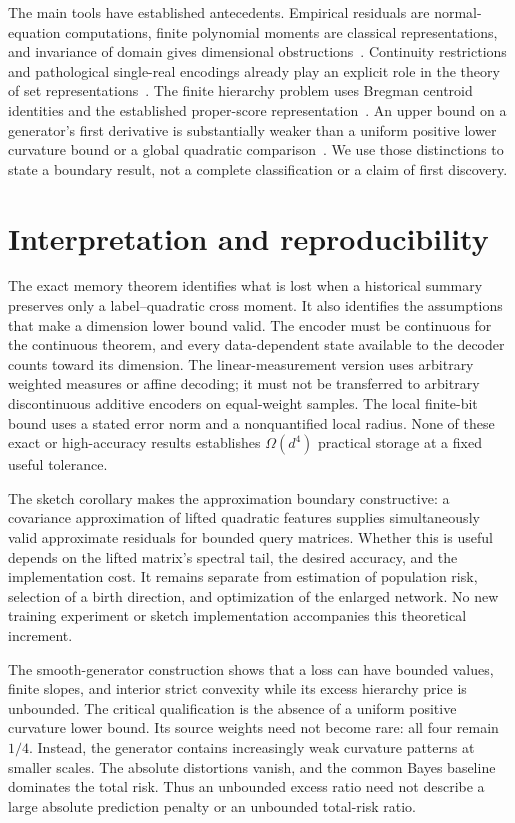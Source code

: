 \documentclass[11pt]{article}
\theoremstyle{remark}
\begin{document}
The main tools have established antecedents. Empirical residuals are
normal-equation computations, finite polynomial moments are classical
representations, and invariance of domain gives dimensional
obstructions~\cite{mit,tchakaloff,tao}. Continuity restrictions and
pathological single-real encodings already play an explicit role in
the theory of set representations~\cite{wagstaff}. The finite
hierarchy problem uses Bregman centroid identities and the established
proper-score representation~\cite{banerjee2005,telgarsky2012,p7gneiting2007}.
An upper bound on a generator's first derivative is substantially
weaker than a uniform positive lower curvature bound or a global
quadratic comparison~\cite{ackermann2009}. We use those distinctions
to state a boundary result, not a complete classification or a claim
of first discovery.





\section{Interpretation and reproducibility}
\label{sec:discussion}

The exact memory theorem identifies what is lost when a historical
summary preserves only a label--quadratic cross moment. It also
identifies the assumptions that make a dimension lower bound valid.
The encoder must be continuous for the continuous theorem, and every
data-dependent state available to the decoder counts toward its
dimension. The linear-measurement version uses arbitrary weighted
measures or affine decoding; it must not be transferred to arbitrary
discontinuous additive encoders on equal-weight samples. The local
finite-bit bound uses a stated error norm and a nonquantified local
radius. None of these exact or high-accuracy results establishes
$\Omega(d^4)$ practical storage at a fixed useful tolerance.

The sketch corollary makes the approximation boundary constructive:
a covariance approximation of lifted quadratic features supplies
simultaneously valid approximate residuals for bounded query matrices.
Whether this is useful depends on the lifted matrix's spectral tail,
the desired accuracy, and the implementation cost. It remains
separate from estimation of population risk, selection of a birth
direction, and optimization of the enlarged network. No new training
experiment or sketch implementation accompanies this theoretical
increment.

The smooth-generator construction shows that a loss can have bounded
values, finite slopes, and interior strict convexity while its excess
hierarchy price is unbounded. The critical qualification is the
absence of a uniform positive curvature lower bound. Its source
weights need not become rare: all four remain $1/4$. Instead, the
generator contains increasingly weak curvature patterns at smaller
scales. The absolute distortions
vanish, and the common Bayes baseline dominates the total risk.
Thus an unbounded excess ratio need not describe a large absolute
prediction penalty or an unbounded total-risk ratio.
\end{document}
